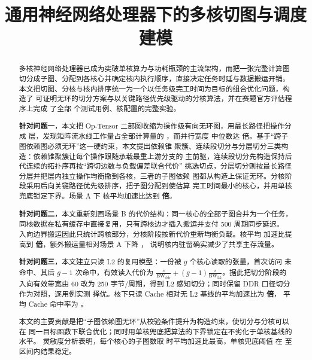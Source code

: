 \documentclass[bwprint]{gmcmthesis}
\title{通用神经网络处理器下的多核切图与调度建模}
\begin{document}
\label{body:start}

\maketitle

\begin{abstract}\label{abstract:start}
多核神经网络处理器已成为突破单核算力与功耗瓶颈的主流架构，而把一张完整计算图
切分成子图、分配到各核心并确定核内执行顺序，直接决定任务时延与数据搬运开销。
本文把切图、分核与核内排序统一为一个以任务级完工时间为目标的组合优化问题，构造了
可证明无环的切分方案与以关键路径优先级驱动的分核算法，并在赛题官方评估程序上完成
了全部 \CaseCount 个测试用例、\CoreRange 核配置的完整实验。

\textbf{针对问题一}，本文把 Op-Tensor 二部图收缩为操作级有向无环图，用最长路径把操作分成
\LevelMed 层，发现矩阵流水线工作量占全部计算量的 \MatShareMed，而并行宽度
中位数达 \WidthMed 倍。基于“跨子图依赖图必须无环”这一硬约束，本文提出依赖锥
聚簇、连续段切分与分层切分三类构造：依赖锥聚簇让每个操作跟随承载最重上游分支的
主前驱，连续段切分先构造保持后代连续的拓扑序再按“跨切边数与负载偏差联合代价”
挑选切点，分层切分则按最长路径分层并把层内独立操作均衡撒到各核，三者的子图依赖
图都从构造上保证无环。分核阶段采用后向关键路径优先级排序，把子图分配到使估算
完工时间最小的核心，并用单核兜底锁定下界。场景 A 下 \CoreFive 核平均加速比达到
\textbf{\QOneSpeedFive 倍}。

\textbf{针对问题二}，本文重新刻画场景 B 的代价结构：同一核心的全部子图合并为一个任务，
同核数据在私有缓存中直接复用，只有跨核边才插入搬运并支付 500 周期同步延迟。
入向边界搬运因此只统计跨核部分，分核阶段按新代价重新均衡负载。\CoreFive 核平均
加速比提高到 \textbf{\QTwoSpeedFive 倍}，额外搬运量相对场景 A 下降 \TrafficDrop，
说明核内驻留确实减少了共享主存流量。

\textbf{针对问题三}，本文建立只读 L2 的复用模型：一份被 $g$ 个核心读取的张量，首次访问
未命中、其后 $g-1$ 次命中，有效读入代价为 $\frac{s}{\mathrm{BW}_{\mathrm{ddr}}}
+(g-1)\frac{s}{\mathrm{BW}_{\mathrm{L2}}}$。据此把切分阶段的入向有效带宽由 60
改为 250 字节/周期，得到 L2 感知切分；同时保留 DDR 口径切分作为对照，逐用例实测
择优。\CoreFive 核下只读 Cache 相对无 L2 基线的平均加速比为 \textbf{\QThreeGainFive 倍}，
平均 Cache 命中率为 \QThreeHitFive。

本文的主要贡献是把“子图依赖图无环”从校验条件提升为构造约束，使切分与分核可以在
同一目标函数下联合优化；同时用单核兜底把算法的下界锁定在不劣化于单核基线的水平。
灵敏度分析表明，每个核心的子图数取 \BestBlocks 时平均加速比最高，单核兜底阈值
在 \MarginLow 至 \MarginHigh 区间内结果稳定。

\label{abstract:end}

\end{abstract}
\end{document}
